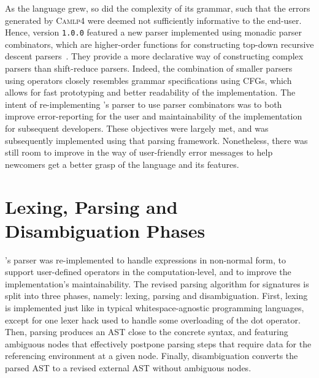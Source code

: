 
As the \Beluga language grew, so did the complexity of its grammar, such that the errors generated by \textsc{Camlp4} were deemed not sufficiently informative to the end-user.
Hence, \Beluga version \texttt{1.0.0} featured a new parser implemented using monadic parser combinators, which are higher-order functions for constructing top-down recursive descent parsers~\cite{Burge1975-BURRPT, hutton1996monadic, leijen2001parsec, generalparsercombs}.
They provide a more declarative way of constructing complex parsers than shift-reduce parsers.
Indeed, the combination of smaller parsers using operators closely resembles grammar specifications using \acp{CFG}, which allows for fast prototyping and better readability of the implementation.
The intent of re-implementing \Beluga's parser to use parser combinators was to both improve error-reporting for the user and maintainability of the implementation for subsequent developers.
These objectives were largely met, and \Harpoon was subsequently implemented using that parsing framework.
Nonetheless, there was still room to improve in the way of user-friendly error messages to help newcomers get a better grasp of the language and its features.






\section{\Beluga Lexing, Parsing and Disambiguation Phases}

\Beluga's parser was re-implemented to handle expressions in non-normal form, to support user-defined operators in the computation-level, and to improve the implementation's maintainability.
The revised parsing algorithm for \Beluga signatures is split into three phases, namely: lexing, parsing and disambiguation.
First, lexing is implemented just like in typical whitespace-agnostic programming languages, except for one lexer hack used to handle some overloading of the dot operator.
Then, parsing produces an \ac{AST} close to the concrete syntax, and featuring ambiguous nodes that effectively postpone parsing steps that require data for the referencing environment at a given node.
Finally, disambiguation converts the parsed \ac{AST} to a revised external \ac{AST} without ambiguous nodes.

